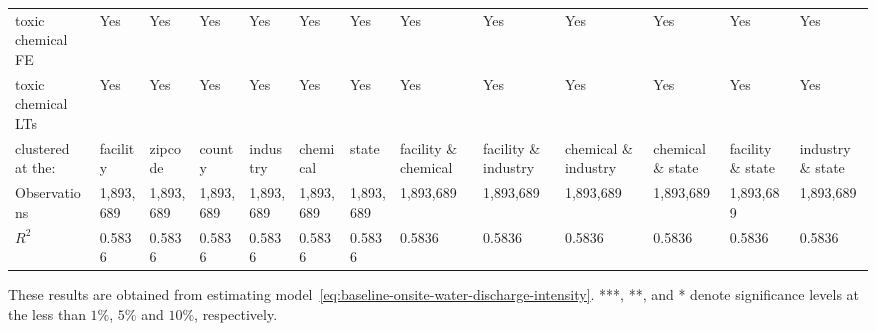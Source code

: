 \begin{table}[H]
{\begin{tabular}{@{}lllllllllllll@{}}
            toxic chemical FE                             & Yes       & Yes       & Yes       & Yes       & Yes       & Yes       & Yes                  & Yes                  & Yes                  & Yes               & Yes               & Yes               \\
            toxic chemical LTs                            & Yes       & Yes       & Yes       & Yes       & Yes       & Yes       & Yes                  & Yes                  & Yes                  & Yes               & Yes               & Yes               \\ \midrule
            clustered at the:                             & facility  & zipcode   & county    & industry  & chemical  & state     & facility \& chemical & facility \& industry & chemical \& industry & chemical \& state & facility \& state & industry \& state \\
            Observations                                  & 1,893,689 & 1,893,689 & 1,893,689 & 1,893,689 & 1,893,689 & 1,893,689 & 1,893,689            & 1,893,689            & 1,893,689            & 1,893,689         & 1,893,689         & 1,893,689         \\
            $R^2$                                         & 0.5836    & 0.5836    & 0.5836    & 0.5836    & 0.5836    & 0.5836    & 0.5836               & 0.5836               & 0.5836               & 0.5836            & 0.5836            & 0.5836            \\ \bottomrule \bottomrule
        \end{tabular}%
    }
    \begin{minipage}{18cm}
        \vspace{0.05in}
        These results are obtained from estimating model~\ref{eq:baseline-onsite-water-discharge-intensity}. ***, **, and * denote significance levels at the less than $1\%$, $5\%$ and $10\%$, respectively.
    \end{minipage}
\end{table}